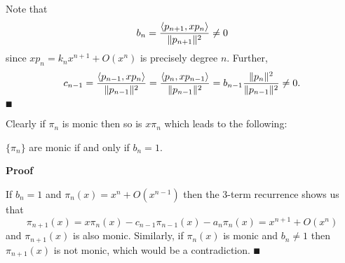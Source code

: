 Note that
\[
b_n = {\ensuremath{\langle}p_{n+1}, x p_n\ensuremath{\rangle} \over \|p_{n+1} \|^2} \ensuremath{\neq} 0
\]
since $x p_n = k_n x^{n+1} + O(x^n)$ is precisely degree $n$. Further,
\[
c_{n-1} = {\ensuremath{\langle}p_{n-1}, x p_n\ensuremath{\rangle} \over \|p_{n-1}\|^2 } =
{\ensuremath{\langle}p_n, x p_{n-1}\ensuremath{\rangle}  \over \|p_{n-1}\|^2 } =  b_{n-1}{\|p_n\|^2  \over \|p_{n-1}\|^2 } \ensuremath{\neq} 0.
\]
\ensuremath{\QED}

Clearly if $\ensuremath{\pi}_n$ is monic then so is $x \ensuremath{\pi}_n$ which leads to the following:

\begin{corollary} $\{\ensuremath{\pi}_n\}$ are monic if and only if $b_n =  1$. \end{corollary}
\textbf{Proof}

If $b_n = 1$ and $\ensuremath{\pi}_n(x) = x^n + O(x^{n-1})$ then the 3-term recurrence shows us that
\[
\ensuremath{\pi}_{n+1}(x) = x \ensuremath{\pi}_n(x) - c_{n-1} \ensuremath{\pi}_{n-1}(x) - a_n \ensuremath{\pi}_n(x) = x^{n+1} + O(x^n)
\]
and $\ensuremath{\pi}_{n+1}(x)$ is also monic. Similarly, if $\ensuremath{\pi}_n(x)$ is monic and $b_n \ensuremath{\neq} 1$ then $\ensuremath{\pi}_{n+1}(x)$ is not monic, which would be a contradiction. \ensuremath{\QED}

